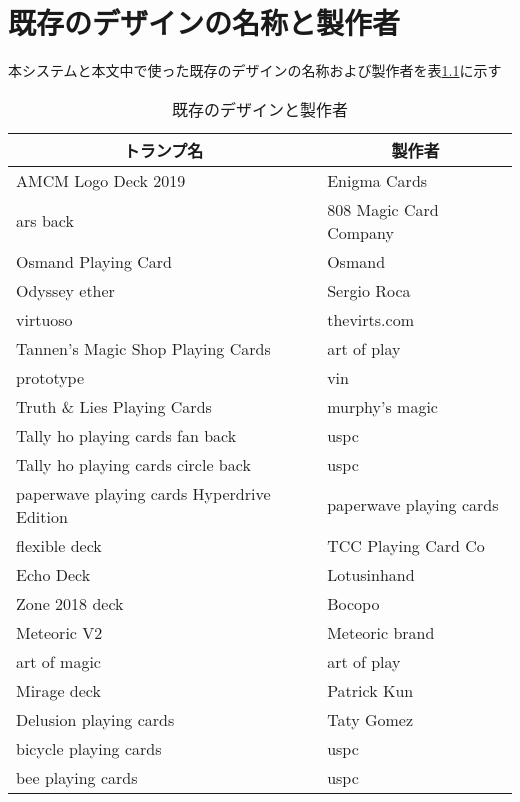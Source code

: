 \chapter{既存のデザインの名称と製作者}
本システムと本文中で使った既存のデザインの名称および製作者を表\ref{cards}に示す

\begin{table}[htbp]
	\centering
	\caption{既存のデザインと製作者}
	\begin{tabular}{|l|l|} \hline
        \multicolumn{1}{|c|}{トランプ名} &\multicolumn{1}{|c|}{製作者} \\ \hline
    AMCM Logo Deck 2019   & Enigma Cards \\ \hline
	ars back     & 808 Magic Card Company\\ \hline
	Osmand Playing Card   & Osmand \\ \hline	
    Odyssey ether  & Sergio Roca \\ \hline 
    virtuoso   & thevirts.com \\ \hline 
    Tannen's Magic Shop Playing Cards   & art of play \\ \hline  
    prototype   & vin \\ \hline  
    Truth \& Lies Playing Cards   & murphy's magic \\ \hline  
    Tally ho playing cards fan back   & uspc \\ \hline 
    Tally ho playing cards circle back   & uspc \\ \hline 
    paperwave playing cards Hyperdrive Edition & paperwave playing cards \\ \hline 
    flexible deck  & TCC Playing Card Co \\ \hline 
    Echo Deck & Lotusinhand \\ \hline
    Zone 2018 deck & Bocopo  \\ \hline
    Meteoric V2 & Meteoric brand  \\ \hline
    art of magic & art of play  \\ \hline
    Mirage deck & Patrick Kun  \\ \hline
    Delusion playing cards & Taty Gomez  \\ \hline
    bicycle playing cards & uspc \\ \hline
    bee playing cards & uspc \\ \hline
	\end{tabular}
	\label{cards}
\end{table}